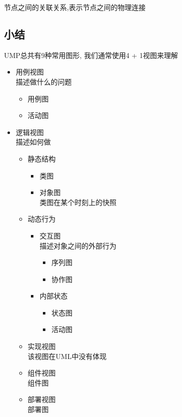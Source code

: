\documentclass[UTF8,a4paper]{ctexart}
\begin{document}
节点之间的关联关系,表示节点之间的物理连接

\subsection{小结}
UMP总共有9种常用图形,
我们通常使用4 + 1视图来理解

\begin{itemize}
  \item 用例视图\\
  描述做什么的问题
  \begin{itemize}
    \item 用例图
    \item 活动图
  \end{itemize}
  \item 逻辑视图\\
  描述如何做
  \begin{itemize}
    \item 静态结构
    \begin{itemize}
      \item 类图
      \item 对象图\\
      类图在某个时刻上的快照
    \end{itemize}
    \item 动态行为
    \begin{itemize}
      \item 交互图\\
      描述对象之间的外部行为
      \begin{itemize}
        \item 序列图
        \item 协作图
      \end{itemize}
      \item 内部状态
      \begin{itemize}
        \item 状态图
        \item 活动图
      \end{itemize}
    \end{itemize}
    \item 实现视图\\
    该视图在UML中没有体现
    \item 组件视图\\
    组件图
    \item 部署视图\\
    部署图
  \end{itemize}
\end{itemize}
\end{document}
